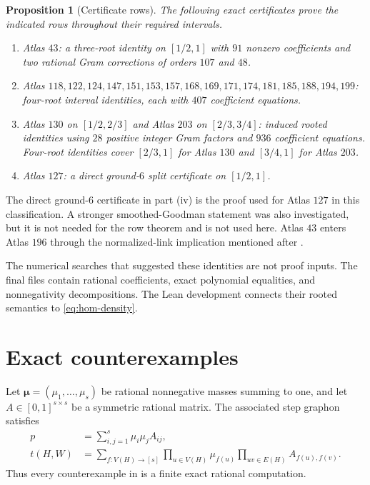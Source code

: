 \documentclass[11pt]{article}
\numberwithin{equation}{section}
\newtheorem{proposition}[theorem]{Proposition}
\theoremstyle{definition}
\theoremstyle{remark}
\begin{document}
\begin{proposition}[Certificate rows]
\label{prop:certificate-rows}
The following exact certificates prove the indicated rows throughout their
required intervals.
\begin{enumerate}[label=(\roman*)]
\item Atlas $43$: a three-root identity on $[1/2,1]$ with $91$ nonzero
coefficients and two rational Gram corrections of orders $107$ and $48$.
\item Atlas
$118,122,124,147,151,153,157,168,169,171,174,181,185,188,194,199$:
four-root interval identities, each with $407$ coefficient equations.
\item Atlas $130$ on $[1/2,2/3]$ and Atlas $203$ on $[2/3,3/4]$:
induced rooted identities using $28$ positive integer Gram factors and
$936$ coefficient equations.  Four-root identities cover $[2/3,1]$ for
Atlas $130$ and $[3/4,1]$ for Atlas $203$.
\item Atlas $127$: a direct ground-$6$ split certificate on $[1/2,1]$.
\end{enumerate}
\end{proposition}

The direct ground-$6$ certificate in part (iv) is the proof used for Atlas
$127$ in this classification.  A stronger smoothed-Goodman statement was
also investigated, but it is not needed for the row theorem and is not used
here.  Atlas $43$ enters Atlas $196$ through the normalized-link implication
mentioned after .

The numerical searches that suggested these identities are not proof
inputs.  The final files contain rational coefficients, exact polynomial
equalities, and nonnegativity decompositions.  The Lean development connects
their rooted semantics to \eqref{eq:hom-density}.

\section{Exact counterexamples}

Let $\boldsymbol\mu=(\mu_1,\ldots,\mu_s)$ be rational nonnegative masses
summing to one, and let $A\in[0,1]^{s\times s}$ be a symmetric rational
matrix.  The associated step graphon satisfies
\begin{align}
 p&=\sum_{i,j=1}^s\mu_i\mu_jA_{ij},
 \label{eq:step-edge-density}\\
 t(H,W)&=\sum_{f:V(H)\to[s]}
 \prod_{u\in V(H)}\mu_{f(u)}
 \prod_{uv\in E(H)}A_{f(u),f(v)}.
 \label{eq:step-hom-density}
\end{align}
Thus every counterexample in  is a finite exact
rational computation.
\end{document}
